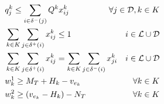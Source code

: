\begin{alignat}{3}
    \label{mod:c240}       & q^k_j \leq \sum_{i \in  \delta^{-}(j)}{Q^k x^k_{ij}}                                                                                                                                                                                                                                             & \hspace{-20mm}  \forall j \in \mathcal{D}, k \in K                                               \\
    \label{mod:c25}        & \sum_{k \in K}\sum_{j \in \delta^{+}(i)}{x^{k}_{ij} \leq 1}                                                                                                                                                                                                                                      & i \in \mathcal{L} \cup \mathcal{D}                                                               \\
    \label{mod:c26}        & \sum_{k \in K}\sum_{j \in \delta^{+}(i)} {x^{k}_{ij} } =  \sum_{k \in K}\sum_{j \in \delta^{-}(i)}{x^{k}_{ji} }                                                                                                                                                                                  & i \in \mathcal{L} \cup \mathcal{D}                                                               \\
    \label{mod:c29}        & w^1_k \geq  M_T + H_k - v_{e_k}                                                                                                                                                                                                                                                                  & \hspace{-20mm} \forall k \in K                                                                   \\
    \label{mod:c30}        & w^2_k \geq (v_{e_k} - H_k) - N_T                                                                                                                                                                                                                                                                 & \hspace{-20mm} \forall k \in K                                                                   \\

\end{alignat}
